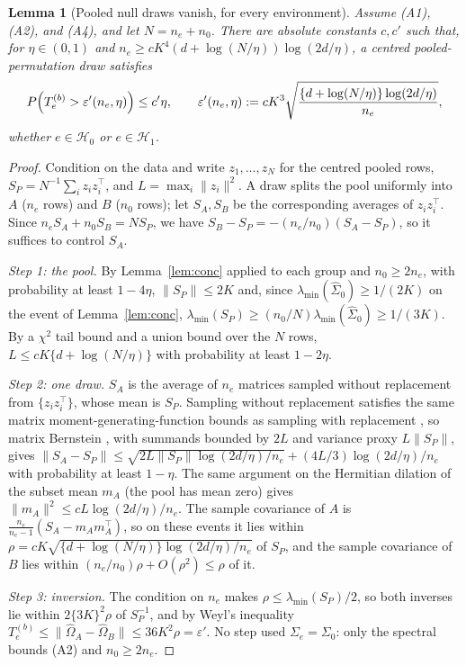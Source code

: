 \documentclass[11pt]{article}
\newtheorem{lemma}{Lemma}
\theoremstyle{remark}
\newcommand{\Hone}{\mathcal{H}_1}
\newcommand{\Hzero}{\mathcal{H}_0}
\begin{document}
\begin{lemma}[Pooled null draws vanish, for every environment]
\label{lem:pooled}
Assume (A1), (A2), and (A4), and let $N=n_e+n_0$. There are absolute constants $c,c'$ such that, for $\eta\in(0,1)$ and $n_e\ge cK^4(d+\log(N/\eta))\log(2d/\eta)$, a centred pooled-permutation draw satisfies
\[
  P\Bigl(T^{(b)}_e>\varepsilon'(n_e,\eta)\Bigr)\le c'\eta,
  \qquad
  \varepsilon'(n_e,\eta):=cK^3\sqrt{\frac{\{d+\log(N/\eta)\}\log(2d/\eta)}{n_e}},
\]
whether $e\in\Hzero$ or $e\in\Hone$.
\end{lemma}

\begin{proof}
Condition on the data and write $z_1,\ldots,z_N$ for the centred pooled rows, $S_P=N^{-1}\sum_iz_iz_i^\top$, and $L=\max_i\|z_i\|^2$. A draw splits the pool uniformly into $A$ ($n_e$ rows) and $B$ ($n_0$ rows); let $S_A,S_B$ be the corresponding averages of $z_iz_i^\top$. Since $n_eS_A+n_0S_B=NS_P$, we have $S_B-S_P=-(n_e/n_0)(S_A-S_P)$, so it suffices to control $S_A$.

\emph{Step 1: the pool.} By Lemma~\ref{lem:conc} applied to each group and $n_0\ge2n_e$, with probability at least $1-4\eta$, $\|S_P\|\le2K$ and, since $\lambda_{\min}(\widehat\Sigma_0)\ge1/(2K)$ on the event of Lemma~\ref{lem:conc}, $\lambda_{\min}(S_P)\ge(n_0/N)\lambda_{\min}(\widehat\Sigma_0)\ge1/(3K)$. By a $\chi^2$ tail bound \citep{laurent2000adaptive} and a union bound over the $N$ rows, $L\le cK\{d+\log(N/\eta)\}$ with probability at least $1-2\eta$.

\emph{Step 2: one draw.} $S_A$ is the average of $n_e$ matrices sampled without replacement from $\{z_iz_i^\top\}$, whose mean is $S_P$. Sampling without replacement satisfies the same matrix moment-generating-function bounds as sampling with replacement \citep{gross2010note}, so matrix Bernstein \citep{tropp2012user}, with summands bounded by $2L$ and variance proxy $L\|S_P\|$, gives
$\|S_A-S_P\|\le\sqrt{2L\|S_P\|\log(2d/\eta)/n_e}+(4L/3)\log(2d/\eta)/n_e$
with probability at least $1-\eta$. The same argument on the Hermitian dilation of the subset mean $m_A$ (the pool has mean zero) gives $\|m_A\|^2\le cL\log(2d/\eta)/n_e$. The sample covariance of $A$ is $\frac{n_e}{n_e-1}(S_A-m_Am_A^\top)$, so on these events it lies within $\rho=cK\sqrt{\{d+\log(N/\eta)\}\log(2d/\eta)/n_e}$ of $S_P$, and the sample covariance of $B$ lies within $(n_e/n_0)\rho+O(\rho^2)\le\rho$ of it.

\emph{Step 3: inversion.} The condition on $n_e$ makes $\rho\le\lambda_{\min}(S_P)/2$, so both inverses lie within $2\{3K\}^2\rho$ of $S_P^{-1}$, and by Weyl's inequality $T^{(b)}_e\le\|\widehat\Omega_A-\widehat\Omega_B\|\le36K^2\rho=\varepsilon'$. No step used $\Sigma_e=\Sigma_0$: only the spectral bounds (A2) and $n_0\ge2n_e$.
\end{proof}
\end{document}
